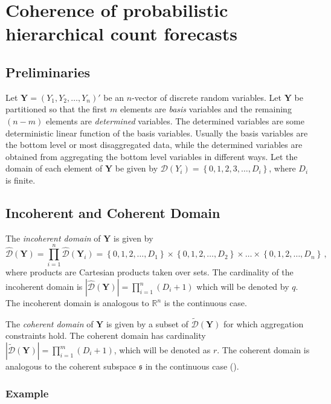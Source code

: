 \documentclass[a4paper,review,12pt,authoryear]{elsarticle}
\newcommand{\bY}{\mathbf{Y}}
\begin{document}
\section{Coherence of probabilistic hierarchical count forecasts}

\label{sec:coherence}

	
\subsection{Preliminaries}
Let $\bY=\left(Y_1,Y_2,\ldots,Y_n\right)'$ be an $n$-vector of discrete random variables.
Let $\bY$ be partitioned so that the first $m$ elements are \textit{basis} variables and the remaining $(n-m)$ elements are \textit{determined} variables.
The determined variables are some deterministic linear function of the basis variables. Usually the basis variables are the bottom level or most disaggregated data, while the determined variables are obtained from aggregating the bottom level variables in different ways. 
Let the domain of each element of $\bY$ be given by $\mathcal{D}(Y_i)=\left\{0, 1,2,3,\dots,D_i\right\}$, where $D_i$ is finite.

\subsection{Incoherent and Coherent Domain}
The \textit{incoherent domain} of $\bY$ is given by
\[
\hat{\mathcal D}(\bY)=\prod\limits_{i=1}^n\hat{\mathcal D}(\bY_i)=\left\{0, 1,2,\dots,D_1\right\}\times\left\{0,1,2,\dots,D_2\right\}\times\dots\times\left\{0,1,2,\dots,D_n\right\}\,,
\] 
where products are Cartesian products taken over sets. The cardinality of the incoherent domain is $|\hat{\mathcal D}(\bY)|=\prod\limits_{i=1}^{n} (D_i+1)$ which will be denoted by $q$. 
The incoherent domain is analogous to $\mathbb{R}^n$ is the continuous case.
  
The \textit{coherent domain} of $\bY$ is given by a subset of $\tilde{\mathcal D}(\bY)$ for which aggregation constraints hold.  
The coherent domain has cardinality $|\tilde{\mathcal D}(\bY)|=\prod\limits_{i=1}^{m} (D_i+1)$, which will be denoted as $r$. 
The coherent domain is analogous to the coherent subspace $\mathfrak{s}$ in the continuous case (\citealp{panagiotelisProbabilisticForecastReconciliation2022}).
  
  \subsubsection*{\textbf{Example}}
  \label{sec:example}
  
\end{document}
